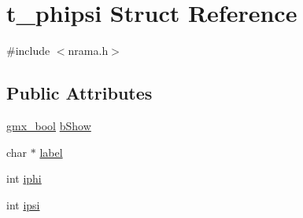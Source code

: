 \hypertarget{structt__phipsi}{\section{t\-\_\-phipsi \-Struct \-Reference}
\label{structt__phipsi}
}


{\ttfamily \#include $<$nrama.\-h$>$}

\subsection*{\-Public \-Attributes}
\begin{DoxyCompactItemize}
\item 
\hyperlink{include_2types_2simple_8h_a8fddad319f226e856400d190198d5151}{gmx\-\_\-bool} \hyperlink{structt__phipsi_a6e8e6d313fe5bb48f5d97d7421cccf25}{b\-Show}
\item 
char $\ast$ \hyperlink{structt__phipsi_adfc2df75e17781152e724f073805b036}{label}
\item 
int \hyperlink{structt__phipsi_af578d9e6ec8562ca4641081a5725a2a1}{iphi}
\item 
int \hyperlink{structt__phipsi_a6dc10c18f3584b8c2d9fe17f33660561}{ipsi}
\end{DoxyCompactItemize}


